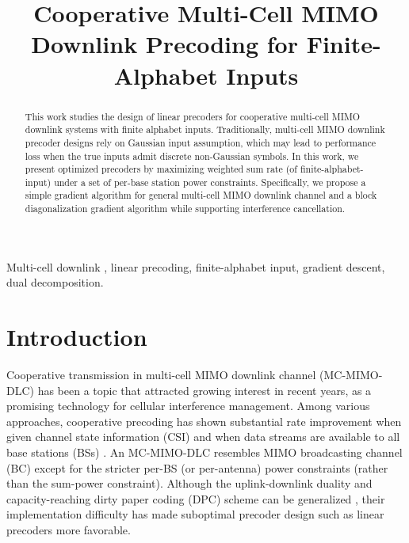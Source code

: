 \documentclass{article}
\title{Cooperative Multi-Cell MIMO Downlink Precoding for Finite-Alphabet Inputs} %
\begin{document}
%
\maketitle
%
\begin{abstract}
    This work studies the design of linear precoders for cooperative multi-cell MIMO downlink
    systems with finite alphabet inputs.
    Traditionally, multi-cell MIMO downlink precoder designs rely on Gaussian input assumption, which may lead to
    performance loss when the true inputs admit discrete non-Gaussian symbols. %
    In this work, we present optimized precoders by maximizing weighted sum rate
    (of finite-alphabet-input) under a set of per-base station power constraints. Specifically,
    we propose a simple gradient algorithm for general multi-cell MIMO downlink channel and a block diagonalization gradient
   algorithm while
    supporting interference cancellation. %
\end{abstract}

\begin{keywords}
    Multi-cell downlink , linear precoding, finite-alphabet input, gradient descent, dual decomposition.
\end{keywords} %
\vspace*{-3mm}

\section{Introduction}
\label{sec:intro}
\vspace*{-2mm}

Cooperative transmission in multi-cell MIMO downlink channel (MC-MIMO-DLC) has been a topic
that attracted growing interest in recent years,
as a promising technology for cellular interference management. Among various approaches,
cooperative precoding has shown substantial rate improvement when given channel state information (CSI) and
when data streams are available to all base stations (BSs) \cite{gesbert2010multi}.
An MC-MIMO-DLC resembles MIMO broadcasting channel (BC) except for the stricter
per-BS (or per-antenna) power constraints
(rather than the sum-power constraint). %
Although the uplink-downlink duality and capacity-reaching dirty paper coding (DPC) scheme
can be generalized \cite{yu2007transmitter, huh2009mimo}, their implementation
difficulty has made suboptimal precoder design such as linear precoders more favorable.
\end{document}
